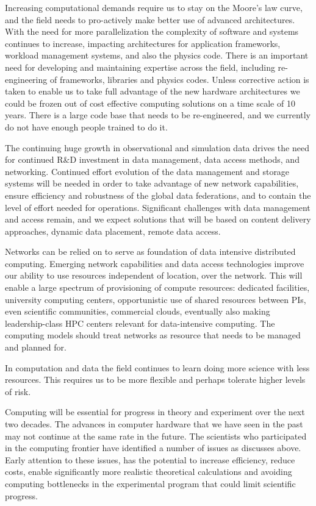 Increasing computational demands require us to stay on the Moore’s law curve, and the field needs to pro-actively make better use of advanced architectures. With the need for more parallelization the complexity of software and systems continues to increase, impacting architectures for application frameworks, workload management systems, and also the physics code. There is an important need for developing and maintaining expertise across the field, including re-engineering of frameworks, libraries and physics codes. Unless corrective action is taken to enable us to take full advantage of the new hardware architectures we could be frozen out of cost effective computing solutions on a time scale of 10 years. There is a large code base that needs to be re-engineered, and we currently do not have enough people trained to do it.

The continuing huge growth in observational and simulation data drives the need for continued R\&D investment in data management, data access methods, and networking.  Continued effort evolution of the data management and storage systems will be needed in order to take advantage of new network capabilities, ensure efficiency and robustness of the global data federations, and to contain the level of effort needed for operations. Significant challenges with data management and access remain, and we expect solutions that will be based on content delivery approaches, dynamic data placement, remote data access. 

Networks can be relied on to serve as foundation of data intensive distributed computing. Emerging network capabilities and data access technologies improve our ability to use resources independent of location, over the network. This will enable a large spectrum of provisioning of compute resources: dedicated facilities, university computing centers, opportunistic use of shared resources between PIs, even scientific communities, commercial clouds, eventually also making leadership-class HPC centers relevant for data-intensive computing. The computing models should treat networks as resource that needs to be managed and planned for. 

In computation and data the field continues to learn doing more science with less resources. This requires us to be more flexible and perhaps tolerate higher levels of risk.

Computing will be essential for progress in theory and experiment over the next two decades.  The advances in computer hardware that we have seen in the past may not continue at the same rate in the future.  The scientists who participated in the computing frontier have identified a number of issues as discusses above. Early attention to these issues, has the potential to increase efficiency, reduce costs, enable significantly more realistic theoretical calculations and avoiding computing bottlenecks in the experimental program that could limit scientific progress.
